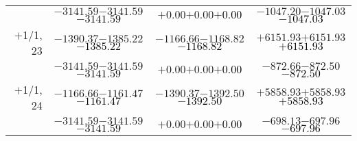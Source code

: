 \documentclass[compress]{beamer}
\begin{document}
\begin{frame}
{\begin{tabular}{r | c | c | c}
           & $-3141.59$\hspace{0.1 cm}$-3141.59$\hspace{0.1 cm}\textcolor{black}{$-3141.59$} & $+0.00$\hspace{0.1 cm}$+0.00$\hspace{0.1 cm}\textcolor{black}{$+0.00$} & $-1047.20$\hspace{0.1 cm}$-1047.03$\hspace{0.1 cm}\textcolor{black}{$-1047.03$} \\
$+$1/1, 23 & $-1390.37$\hspace{0.1 cm}$-1385.22$\hspace{0.1 cm}\textcolor{black}{$-1385.22$} & $-1166.66$\hspace{0.1 cm}$-1168.82$\hspace{0.1 cm}\textcolor{black}{$-1168.82$} & $+6151.93$\hspace{0.1 cm}$+6151.93$\hspace{0.1 cm}\textcolor{black}{$+6151.93$} \\
           & $-3141.59$\hspace{0.1 cm}$-3141.59$\hspace{0.1 cm}\textcolor{black}{$-3141.59$} & $+0.00$\hspace{0.1 cm}$+0.00$\hspace{0.1 cm}\textcolor{black}{$+0.00$} & $-872.66$\hspace{0.1 cm}$-872.50$\hspace{0.1 cm}\textcolor{black}{$-872.50$} \\
$+$1/1, 24 & $-1166.66$\hspace{0.1 cm}$-1161.47$\hspace{0.1 cm}\textcolor{black}{$-1161.47$} & $-1390.37$\hspace{0.1 cm}$-1392.50$\hspace{0.1 cm}\textcolor{black}{$-1392.50$} & $+5858.93$\hspace{0.1 cm}$+5858.93$\hspace{0.1 cm}\textcolor{black}{$+5858.93$} \\
           & $-3141.59$\hspace{0.1 cm}$-3141.59$\hspace{0.1 cm}\textcolor{black}{$-3141.59$} & $+0.00$\hspace{0.1 cm}$+0.00$\hspace{0.1 cm}\textcolor{black}{$+0.00$} & $-698.13$\hspace{0.1 cm}$-697.96$\hspace{0.1 cm}\textcolor{black}{$-697.96$} \\
\end{tabular}}
\end{frame}
\end{document}
